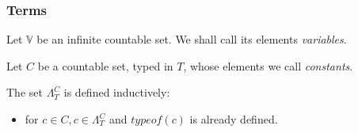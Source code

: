 \documentclass[main.tex]{subfiles}
\begin{document}
\subsubsection{Terms}
\begin{defn}
    Let $\mathbb{V}$ be an infinite countable set. We shall call its elements
    \emph{variables}.
\end{defn}

\begin{defn}
    Let $C$ be a countable set, typed in $T$,
    whose elements we call \emph{constants}.

    The set $\Lambda_T^C$ is defined inductively:
    \begin{itemize}
        \item for $c \in C, c \in \Lambda_T^C$
            and $typeof(c)$ is already defined.

    \end{itemize}
\end{defn}
\end{document}
